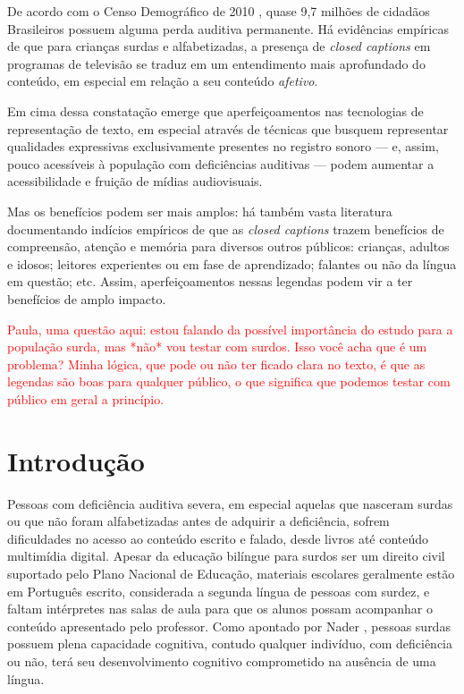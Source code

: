 \documentclass[a4paper,11pt,titlepage,singlespacing]{article}
\newcommand\todo[1]{\textcolor{red}{#1}}
\begin{document}
\noindent De acordo com o Censo Demográfico de 2010 \cite{censo2010}, quase 9,7 milhões de cidadãos Brasileiros possuem alguma perda auditiva permanente. Há evidências empíricas de que para crianças surdas e alfabetizadas, a presença de \textit{closed captions} em programas de televisão se traduz em um entendimento mais aprofundado do conteúdo, em especial em relação a seu conteúdo \textit{afetivo}. %

Em cima dessa constatação emerge que aperfeiçoamentos nas tecnologias de representação de texto, em especial através de técnicas que busquem representar qualidades expressivas exclusivamente presentes no registro sonoro — e, assim, pouco acessíveis à população com deficiências auditivas — podem aumentar a acessibilidade e fruição de mídias audiovisuais.

Mas os benefícios podem ser mais amplos: há também vasta literatura documentando indícios empíricos de que as \textit{closed captions} trazem benefícios de compreensão, atenção e memória para diversos outros públicos: crianças, adultos e idosos; leitores experientes ou em fase de aprendizado; falantes ou não da língua em questão; etc. Assim, aperfeiçoamentos nessas legendas podem vir a ter benefícios de amplo impacto.

\todo{Paula, uma questão aqui: estou falando da possível importância do estudo para a população surda, mas *não* vou testar com surdos. Isso você acha que é um problema? Minha lógica, que pode ou não ter ficado clara no texto, é que as legendas são boas para qualquer público, o que significa que podemos testar com público em geral a princípio. }


\newpage


\thispagestyle{empty}
\newpage
{}


\renewcommand{\contentsname}{Sumário}
\tableofcontents

\newpage

\section{Introdução}

Pessoas com deficiência auditiva severa, em especial aquelas que nasceram surdas ou que não foram alfabetizadas antes de adquirir a deficiência, sofrem dificuldades no acesso ao conteúdo escrito e falado, desde livros até conteúdo multimídia digital. Apesar da educação bilíngue para surdos ser um direito civil suportado pelo Plano Nacional de Educação, materiais escolares geralmente estão em Português escrito, considerada a segunda língua de pessoas com surdez, e faltam intérpretes nas salas de aula para que os alunos possam acompanhar o conteúdo apresentado pelo professor. Como apontado por Nader \cite{nader}, pessoas surdas possuem plena capacidade cognitiva, contudo qualquer indivíduo, com deficiência ou não, terá seu desenvolvimento cognitivo comprometido na ausência de uma língua.
\end{document}
